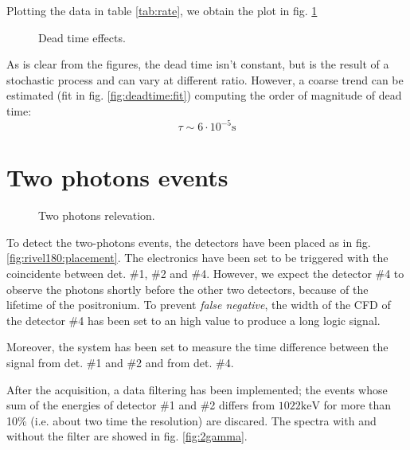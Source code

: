 \documentclass[11pt,a4 paper]{article}
\begin{document}
Plotting the data in table \ref{tab:rate}, we obtain the plot in fig. \ref{fig:deadtime}

\begin{figure}[H]
    \centering
     \quad
    \caption{Dead time effects.}
    \label{fig:deadtime}
\end{figure}

As is clear from the figures, the dead time isn't constant, but is the result of a stochastic process and can vary at different ratio. However, a coarse trend can be estimated (fit in fig. \ref{fig:deadtime:fit}) computing the order of magnitude of dead time:
\begin{equation}
    \tau \sim 6\cdot10^{-5} \si{\second}
\end{equation}
\section{Two photons events}

\begin{figure}[H]
    \centering
     \quad
    \caption{Two photons relevation.}
    \label{fig:rivel180}
\end{figure}

To detect the two-photons events, the detectors have been placed as in fig. \ref{fig:rivel180:placement}. The electronics have been set to be triggered with the coincidente between det. \#1, \#2 and \#4. However, we expect the detector \#4 to observe the photons shortly before the other two detectors, because of the lifetime of the positronium. To prevent \emph{false negative}, the width of the CFD of the detector \#4 has been set to an high value to produce a long logic signal.

Moreover, the system has been set to measure the time difference between the signal from det. \#1 and \#2 and from det. \#4.

After the acquisition, a data filtering has been implemented; the events whose sum of the energies of detector \#1 and \#2 differs from $1022\si{\kilo\electronvolt}$ for more than 10\% (i.e. about two time the resolution) are discared. The spectra with and without the filter are showed in fig. \ref{fig:2gamma}.
\end{document}
